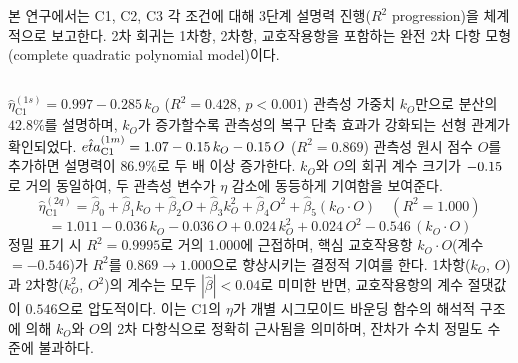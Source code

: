 

\section{}
\label{sec:regression_results}

본 연구에서는 C1, C2, C3 각 조건에 대해 3단계  설명력 진행($R^2$ progression)을
체계적으로 보고한다. 2차 회귀는 1차항, 2차항, 교호작용항을 포함하는
완전 2차 다항 모형(complete quadratic polynomial model)이다.


\subsection{}
\label{subsec:reg_c1}

$\hat{\eta}_{\text{C1}}^{(1s)} = 0.997 - 0.285\,k_O$ ($R^2 = 0.428$, $p < 0.001$)
관측성 가중치 $k_O$만으로 분산의 $42.8\%$를 설명하며, $k_O$가
증가할수록 관측성의 복구 단축 효과가 강화되는 선형 관계가 확인되었다.
 $\hat{\eta}_{\text{C1}}^{(1m)} = \erf{1.07 - 0.15\,k_O - 0.15\,O}{1.137 - 0.280\,k_O - 0.288\,O}$ ($R^2 = 0.869$)
관측성 원시 점수 $O$를 추가하면 설명력이 $86.9\%$로 두 배 이상
증가한다. $k_O$와 $O$의 회귀 계수 크기가 $\erf{-0.15}{-0.28}$로 거의 동일하여,
두 관측성 변수가 $\eta$ 감소에 동등하게 기여함을 보여준다.
\begin{equation}
  \hat{\eta}_{\text{C1}}^{(2q)} = \hat{\beta}_0
    + \hat{\beta}_1 k_O + \hat{\beta}_2 O
    + \hat{\beta}_3 k_O^2 + \hat{\beta}_4 O^2
    + \hat{\beta}_5 (k_O \cdot O)
  \quad (R^2 = 1.000)
\end{equation}
\begin{equation}
  = 1.011
    - 0.036\,k_O - 0.036\,O
    + 0.024\,k_O^2 + 0.024\,O^2
    - 0.546\,(k_O \cdot O)
\end{equation}
정밀 표기 시 $R^2 = 0.9995$로 거의 1.000에 근접하며,
핵심 교호작용항 $k_O \cdot O$(계수 $= -0.546$)가
$R^2$를 $0.869 \to 1.000$으로 향상시키는 결정적 기여를 한다.
1차항($k_O$, $O$)과 2차항($k_O^2$, $O^2$)의 계수는 모두
$|\hat{\beta}| < 0.04$로 미미한 반면,
교호작용항의 계수 절댓값이 $0.546$으로 압도적이다.
이는 C1의 $\eta$가 개별 시그모이드 바운딩 함수의 해석적 구조에 의해
$k_O$와 $O$의 2차 다항식으로 정확히 근사됨을 의미하며,
잔차가 수치 정밀도 수준에 불과하다.


